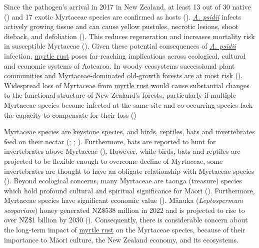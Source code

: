 \documentclass[
]{scrreprt}
\begin{document}
Since the pathogen's arrival in 2017 in New Zealand, at least 13 out of
30 native () and 17 exotic Myrtaceae species are confirmed as hosts
(). \hyperref[acronyms_AP]{\emph{A. psidii}} infects actively
growing tissue and can cause yellow pustules, necrotic lesions, shoot
dieback, and defoliation
().
This reduces regeneration and increases mortality risk in susceptible
Myrtaceae (). Given these potential consequences of
\hyperref[acronyms_AP]{\emph{A. psidii}} infection,
\hyperref[acronyms_MR]{myrtle rust} poses far-reaching implications
across ecological, cultural and economic systems of Aotearoa. In woody
ecosystems successional plant communities and Myrtaceae-dominated
old-growth forests are at most risk
(). Widespread loss of Myrtaceae from \hyperref[acronyms_MR]{myrtle
rust} would cause substantial changes to the functional structure of New
Zealand's forests, particularly if multiple Myrtaceae species become
infected at the same site and co-occurring species lack the capacity to
compensate for their loss
()

Myrtaceae species are keystone species, and birds, reptiles, bats and
invertebrates feed on their nectar
(; ;
). Furthermore, bats are reported to hunt for invertebrates above
Myrtaceae (). However, while birds, bats and reptiles are projected
to be flexible enough to overcome decline of Myrtaceae, some
invertebrates are thought to have an obligate relationship with
Myrtaceae species
(). Beyond ecological concerns, many Myrtaceae are taonga (treasure)
species which hold profound cultural and spiritual significance for
Māori ().
Furthermore, Myrtaceae species have significant economic value
().
Mānuka (\emph{Leptospermum scoparium}) honey generated NZ\$538 million
in 2022 and is projected to rise to over NZ\$1 billion by 2030
(). Consequently, there is considerable concern about the
long-term impact of \hyperref[acronyms_MR]{myrtle rust} on the Myrtaceae
species, because of their importance to Māori culture, the New Zealand
economy, and its ecosystems.
\end{document}
